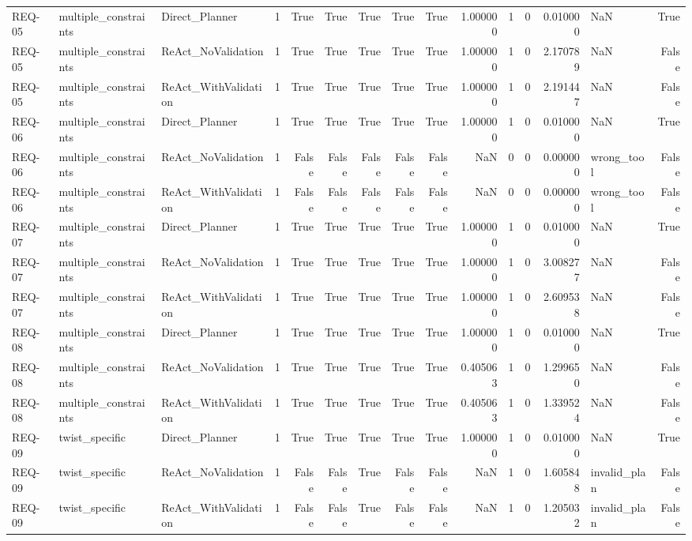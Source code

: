 \begin{table}[htbp]
\begin{tabular}{lllrrrrrrrrrrlr}
REQ-05 & multiple\_constraints & Direct\_Planner & 1 & True & True & True & True & True & 1.000000 & 1 & 0 & 0.010000 & NaN & True \\
REQ-05 & multiple\_constraints & ReAct\_NoValidation & 1 & True & True & True & True & True & 1.000000 & 1 & 0 & 2.170789 & NaN & False \\
REQ-05 & multiple\_constraints & ReAct\_WithValidation & 1 & True & True & True & True & True & 1.000000 & 1 & 0 & 2.191447 & NaN & False \\
REQ-06 & multiple\_constraints & Direct\_Planner & 1 & True & True & True & True & True & 1.000000 & 1 & 0 & 0.010000 & NaN & True \\
REQ-06 & multiple\_constraints & ReAct\_NoValidation & 1 & False & False & False & False & False & NaN & 0 & 0 & 0.000000 & wrong\_tool & False \\
REQ-06 & multiple\_constraints & ReAct\_WithValidation & 1 & False & False & False & False & False & NaN & 0 & 0 & 0.000000 & wrong\_tool & False \\
REQ-07 & multiple\_constraints & Direct\_Planner & 1 & True & True & True & True & True & 1.000000 & 1 & 0 & 0.010000 & NaN & True \\
REQ-07 & multiple\_constraints & ReAct\_NoValidation & 1 & True & True & True & True & True & 1.000000 & 1 & 0 & 3.008277 & NaN & False \\
REQ-07 & multiple\_constraints & ReAct\_WithValidation & 1 & True & True & True & True & True & 1.000000 & 1 & 0 & 2.609538 & NaN & False \\
REQ-08 & multiple\_constraints & Direct\_Planner & 1 & True & True & True & True & True & 1.000000 & 1 & 0 & 0.010000 & NaN & True \\
REQ-08 & multiple\_constraints & ReAct\_NoValidation & 1 & True & True & True & True & True & 0.405063 & 1 & 0 & 1.299650 & NaN & False \\
REQ-08 & multiple\_constraints & ReAct\_WithValidation & 1 & True & True & True & True & True & 0.405063 & 1 & 0 & 1.339524 & NaN & False \\
REQ-09 & twist\_specific & Direct\_Planner & 1 & True & True & True & True & True & 1.000000 & 1 & 0 & 0.010000 & NaN & True \\
REQ-09 & twist\_specific & ReAct\_NoValidation & 1 & False & False & True & False & False & NaN & 1 & 0 & 1.605848 & invalid\_plan & False \\
REQ-09 & twist\_specific & ReAct\_WithValidation & 1 & False & False & True & False & False & NaN & 1 & 0 & 1.205032 & invalid\_plan & False \\

\end{tabular}
\end{table}

